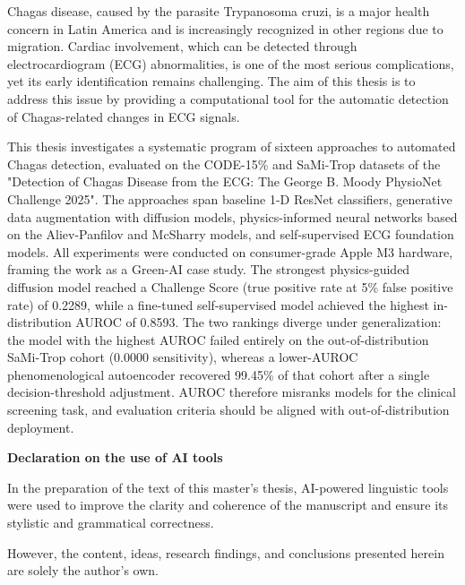 \documentclass[english]{agh-wi}     %
\begin{document}
\begin{abstractEN}
    Chagas disease, caused by the parasite Trypanosoma cruzi, is a major health concern in Latin America and is increasingly recognized in other regions due to migration. Cardiac involvement, which can be detected through electrocardiogram (ECG) abnormalities, is one of the most serious complications, yet its early identification remains challenging. The aim of this thesis is to address this issue by providing a computational tool for the automatic detection of Chagas-related changes in ECG signals.

This thesis investigates a systematic program of sixteen approaches to automated Chagas detection, evaluated on the CODE-15\% and SaMi-Trop datasets of the "Detection of Chagas Disease from the ECG: The George B. Moody PhysioNet Challenge 2025". The approaches span baseline 1-D ResNet classifiers, generative data augmentation with diffusion models, physics-informed neural networks based on the Aliev-Panfilov and McSharry models, and self-supervised ECG foundation models. All experiments were conducted on consumer-grade Apple M3 hardware, framing the work as a Green-AI case study.
The strongest physics-guided diffusion model reached a Challenge Score (true positive rate at 5\% false positive rate) of 0.2289, while a fine-tuned self-supervised model achieved the highest in-distribution AUROC of 0.8593. The two rankings diverge under generalization: the model with the highest AUROC failed entirely on the out-of-distribution SaMi-Trop cohort (0.0000 sensitivity), whereas a lower-AUROC phenomenological autoencoder recovered 99.45\% of that cohort after a single decision-threshold adjustment. AUROC therefore misranks models for the clinical screening task, and evaluation criteria should be aligned with out-of-distribution deployment.
\end{abstractEN}
\cleardoublepage
\thispagestyle{empty}
\vspace*{\fill}
\begin{center}
\begin{minipage}{0.8\textwidth}
\begin{center}\textbf{Declaration on the use of AI tools}\end{center}
\noindent In the preparation of the text of this master's thesis, AI-powered linguistic tools were used to improve the clarity and coherence of the manuscript and ensure its stylistic and grammatical correctness.

\medskip
\noindent However, the content, ideas, research findings, and conclusions presented herein are solely the author's own.
\end{minipage}
\end{center}
\end{document}
